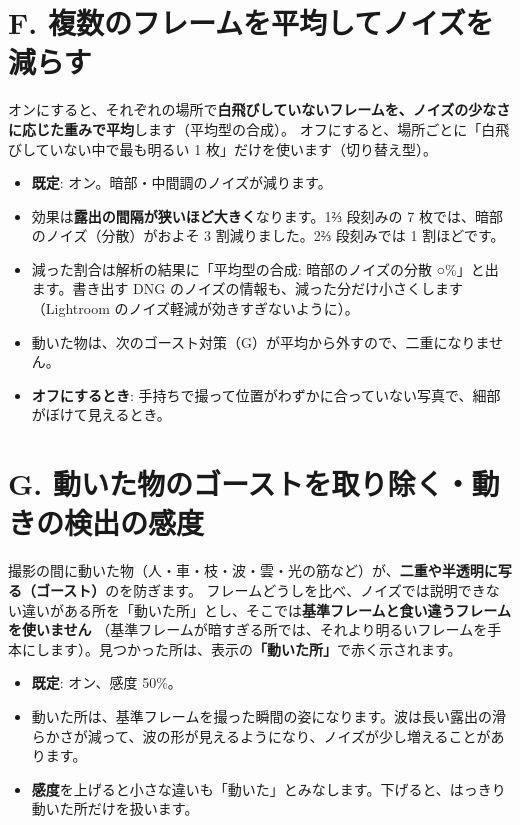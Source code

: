 \documentclass[paper=a4paper,fontsize=11pt,report,jafontsize=11pt]{jlreq}
\newcommand{\ui}[1]{\textsf{\textbf{「#1」}}}
\begin{document}
\section{F. 複数のフレームを平均してノイズを減らす}\label{sec:average}
オンにすると、それぞれの場所で\textbf{白飛びしていないフレームを、ノイズの少なさに応じた重みで平均}します（平均型の合成）。
オフにすると、場所ごとに「白飛びしていない中で最も明るい 1 枚」だけを使います（切り替え型）。
\begin{itemize}
  \item \textbf{既定}: オン。暗部・中間調のノイズが減ります。
  \item 効果は\textbf{露出の間隔が狭いほど大きく}なります。1⅔ 段刻みの 7 枚では、暗部のノイズ（分散）がおよそ 3 割減りました。2⅔ 段刻みでは 1 割ほどです。
  \item 減った割合は解析の結果に「平均型の合成: 暗部のノイズの分散 ○\%」と出ます。書き出す DNG のノイズの情報も、減った分だけ小さくします（Lightroom のノイズ軽減が効きすぎないように）。
  \item 動いた物は、次のゴースト対策（G）が平均から外すので、二重になりません。
  \item \textbf{オフにするとき}: 手持ちで撮って位置がわずかに合っていない写真で、細部がぼけて見えるとき。
\end{itemize}

\section{G. 動いた物のゴーストを取り除く・動きの検出の感度}\label{sec:deghost}
撮影の間に動いた物（人・車・枝・波・雲・光の筋など）が、\textbf{二重や半透明に写る（ゴースト）}のを防ぎます。
フレームどうしを比べ、ノイズでは説明できない違いがある所を「動いた所」とし、そこでは\textbf{基準フレームと食い違うフレームを使いません}
（基準フレームが暗すぎる所では、それより明るいフレームを手本にします）。見つかった所は、表示の\ui{動いた所}で赤く示されます。
\begin{itemize}
  \item \textbf{既定}: オン、感度 50\%。
  \item 動いた所は、基準フレームを撮った瞬間の姿になります。波は長い露出の滑らかさが減って、波の形が見えるようになり、ノイズが少し増えることがあります。
  \item \textbf{感度}を上げると小さな違いも「動いた」とみなします。下げると、はっきり動いた所だけを扱います。
\end{itemize}
\end{document}
